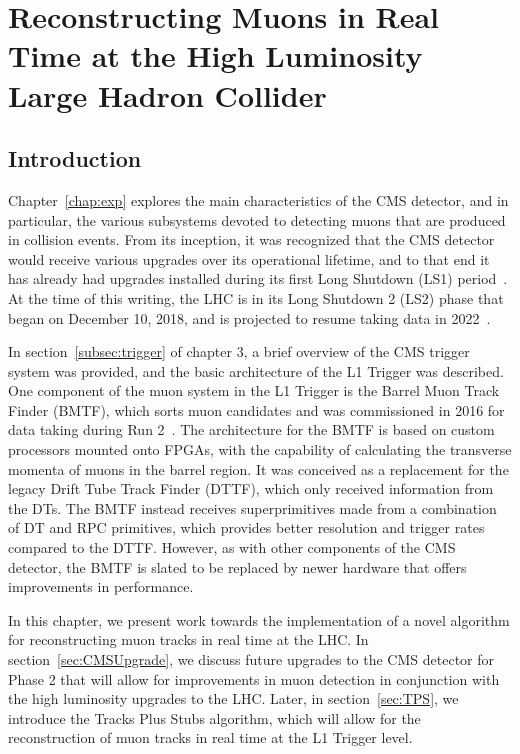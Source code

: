 
\chapter{Reconstructing Muons in Real Time at the High Luminosity Large Hadron Collider}
\label{chap:TPS}

\section{Introduction}

Chapter~\ref{chap:exp} explores the main characteristics of the CMS detector, and in particular, the various subsystems devoted to detecting muons that are produced in collision events.
From its inception, it was recognized that the CMS detector would receive various upgrades over its operational lifetime, and to that end it has already had upgrades installed during its first Long Shutdown (LS1) period~\cite{Battilana:2017mrm,Kreis:2103853}.
At the time of this writing, the LHC is in its Long Shutdown 2 (LS2) phase that began on December 10, 2018, and is projected to resume taking data in 2022~\cite{LHCsched}.

In section~\ref{subsec:trigger} of chapter 3, a brief overview of the CMS trigger system was provided, and the basic architecture of the L1 Trigger was described.
One component of the muon system in the L1 Trigger is the Barrel Muon Track Finder (BMTF), which sorts muon candidates and was commissioned in 2016 for data taking during Run 2~\cite{Ero:2102885}.
The architecture for the BMTF is based on custom processors mounted onto FPGAs, with the capability of calculating the transverse momenta of muons in the barrel region.
It was conceived as a replacement for the legacy Drift Tube Track Finder (DTTF), which only received information from the DTs.
The BMTF instead receives superprimitives made from a combination of DT and RPC primitives, which provides better resolution and trigger rates compared to the DTTF.
However, as with other components of the CMS detector, the BMTF is slated to be replaced by newer hardware that offers improvements in performance.

In this chapter, we present work towards the implementation of a novel algorithm for reconstructing muon tracks in real time at the LHC.
In section~\ref{sec:CMSUpgrade}, we discuss future upgrades to the CMS detector for Phase 2 that will allow for improvements in muon detection in conjunction with the high luminosity upgrades to the LHC.
Later, in section~\ref{sec:TPS}, we introduce the Tracks Plus Stubs algorithm, which will allow for the reconstruction of muon tracks in real time at the L1 Trigger level.

